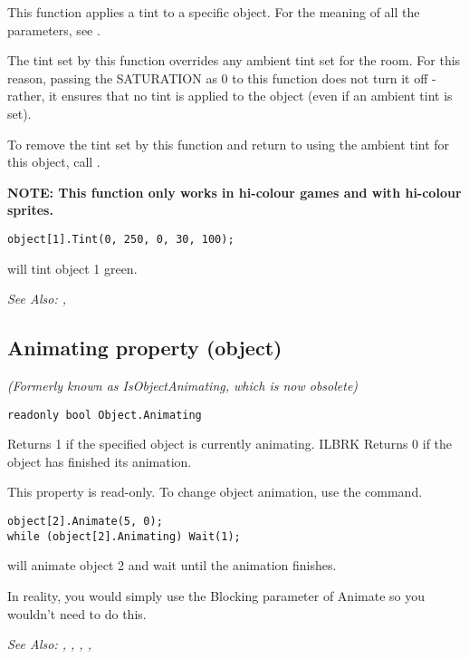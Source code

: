 This function applies a tint to a specific object. For the meaning of all the parameters,
see .

The tint set by this function overrides any ambient tint set for the room. For this
reason, passing the SATURATION as 0 to this function does not turn it off - rather, it
ensures that no tint is applied to the object (even if an ambient tint is set).

To remove the tint set by this function and return to using the ambient tint for this
object, call .

\bf{NOTE:} This function only works in hi-colour games and with hi-colour sprites.

\begin{verbatim}
object[1].Tint(0, 250, 0, 30, 100);
\end{verbatim}
will tint object 1 green.

\it{See Also:} ,



\subsection{Animating property (object)}\label{Object.Animating}%

\it{(Formerly known as IsObjectAnimating, which is now obsolete)}

\begin{verbatim}
readonly bool Object.Animating
\end{verbatim}
Returns 1 if the specified object is currently animating. ILBRK
Returns 0 if the object has finished its animation.

This property is read-only. To change object animation, use the
 command.

\begin{verbatim}
object[2].Animate(5, 0);
while (object[2].Animating) Wait(1);
\end{verbatim}
will animate object 2 and wait until the animation finishes.

In reality, you would simply use the Blocking parameter of Animate so you wouldn't need
to do this.

\it{See Also:} ,
,
,
, 


